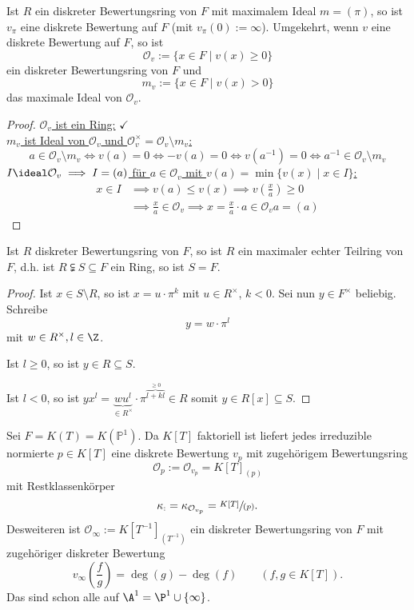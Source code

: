 \begin{satz}
    Ist $R$ ein diskreter Bewertungsring von $F$ mit maximalem Ideal $m = (\pi)$, so ist $v_\pi$ eine 
    diskrete Bewertung auf $F$ (mit $v_\pi(0) := \infty$).
    Umgekehrt, wenn $v$ eine diskrete Bewertung auf $F$, so ist
    $$ \mathcal{O}_v := \{x \in F \mid v(x) \geq 0\}$$
    ein diskreter Bewertungsring von $F$ und
    $$ m_v := \{x \in F \mid v(x) > 0\} $$
    das maximale Ideal von $\mathcal{O}_v$.
\end{satz}
\begin{proof}
    \underline{$\mathcal{O}_v$ ist ein Ring:} $\checkmark$\\
    \underline{$m_v$ ist Ideal von $\mathcal{O}_v$ und $\mathcal{O}_v^\times = \mathcal{O}_v\setminus m_v$:}
    $$ a \in \mathcal{O}_v \setminus m_v \iff v(a) = 0 \iff -v(a) = 0 \iff v(a^{-1}) = 0 \iff a^{-1} \in \mathcal{O}_v \setminus m_v $$
    \underline{$I \ideal \mathcal{O}_v \implies I=(a)$ für $a \in \mathcal{O}_v$ mit $v(a) = \min\{v(x) \mid x \in I\}$:}
    \begin{align*}
        x \in I & \implies v(a) \leq v(x) \implies v\left(\frac{x}{a}\right) \geq 0\\
        & \implies \frac{x}{a} \in \mathcal{O}_v \implies x = \frac{x}{a}\cdot a \in \mathcal{O}_v a = (a)
    \end{align*}
\end{proof}

\begin{lemma}
    Ist $R$ diskreter Bewertungsring von $F$, so ist $R$ ein maximaler echter Teilring von $F$, d.h. ist
    $R \subsetneqq S \subseteq F$ ein Ring, so ist $S = F$.
\end{lemma}
\begin{proof}
    Ist $x \in S \setminus R$, so ist $x = u \cdot \pi^k$ mit $u \in R^\times$, $k< 0$.
    Sei nun $y \in F^\times$ beliebig. Schreibe
    $$ y = w \cdot \pi^l$$
    mit $w \in R^\times, l \in \Z$.

    Ist \underline{$l \geq 0$}, so ist $y \in R \subseteq S$.

    Ist \underline{$l < 0$}, so ist $yx^l=\underbrace{wu^l}_{\in R^\times} \cdot \pi^{\overbrace{l+kl}^{\geq 0}}\in R$
    somit $y \in R[x] \subseteq S$.
\end{proof}

\begin{beispiel}
    Sei $F = K(T) = K(\mathbb{P}^1)$. Da $K[T]$ faktoriell ist liefert jedes irreduzible normierte $p\in K[T]$ eine 
    diskrete Bewertung $v_p$ mit zugehörigem Bewertungsring
    $$ \mathcal{O}_p := \mathcal{O}_{v_p} = K[T]_{(p)}$$
    mit Restklassenkörper
    $$ \kappa_ := \kappa_{\mathcal{O}_{v_p}} = \sfrac{K[T]}{(p)}.$$
    Desweiteren ist $\mathcal{O}_\infty := K[T^{-1}]_{(T^{-1})}$ ein diskreter Bewertungsring von $F$ mit zugehöriger diskreter Bewertung
    $$v_\infty\left(\frac{f}{g}\right) = \deg(g) - \deg(f) \qquad (f,g \in K[T]) .$$
    Das sind schon alle auf $\A^1 = \P^1 \cup \{\infty\}$.
\end{beispiel}

